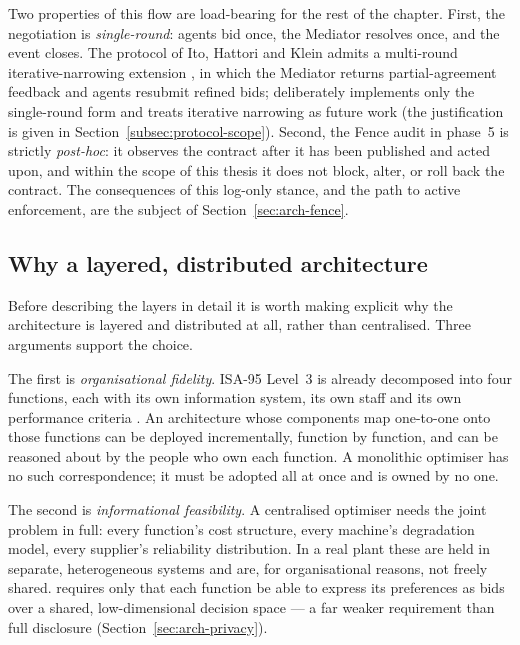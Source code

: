 
Two properties of this flow are load-bearing for the rest of the
chapter. First, the negotiation is \emph{single-round}: agents bid
once, the Mediator resolves once, and the event closes. The protocol of
Ito, Hattori and Klein admits a multi-round iterative-narrowing
extension \cite{hattori2007narrowing}, in which the Mediator returns
partial-agreement feedback and agents resubmit refined bids; \NEXUS{}
deliberately implements only the single-round form and treats iterative
narrowing as future work (the justification is given in
Section~\ref{subsec:protocol-scope}). Second, the Fence audit in
phase~5 is strictly \emph{post-hoc}: it observes the contract after it
has been published and acted upon, and within the scope of this thesis
it does not block, alter, or roll back the contract. The consequences of
this log-only stance, and the path to active enforcement, are the
subject of Section~\ref{sec:arch-fence}.

\subsection{Why a layered, distributed architecture}
\label{subsec:why-layered}

Before describing the layers in detail it is worth making explicit why
the architecture is layered and distributed at all, rather than
centralised. Three arguments support the choice.

The first is \emph{organisational fidelity}. ISA-95 Level~3 is already
decomposed into four functions, each with its own information system,
its own staff and its own performance criteria \cite{sprock2019isa95}.
An architecture whose components map one-to-one onto those functions
can be deployed incrementally, function by function, and can be reasoned
about by the people who own each function. A monolithic optimiser has
no such correspondence; it must be adopted all at once and is owned by
no one.

The second is \emph{informational feasibility}. A centralised optimiser
needs the joint problem in full: every function's cost structure, every
machine's degradation model, every supplier's reliability distribution.
In a real plant these are held in separate, heterogeneous systems and
are, for organisational reasons, not freely shared. \NEXUS{} requires
only that each function be able to express its preferences as bids over
a shared, low-dimensional decision space --- a far weaker requirement
than full disclosure (Section~\ref{sec:arch-privacy}).

